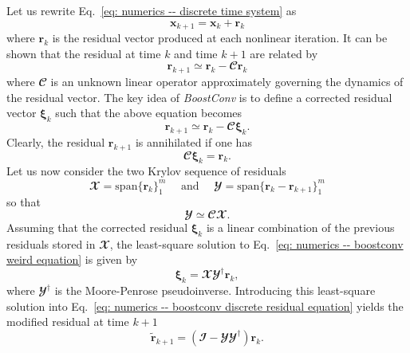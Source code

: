     Let us rewrite Eq.\ \eqref{eq: numerics -- discrete time system} as
    \begin{equation}
      \mathbf{x}_{k+1} = \mathbf{x}_k + \mathbf{r}_k
      \label{eq: numerics -- boostconv discrete system}
    \end{equation}
    where $\mathbf{r}_k$ is the residual vector produced at each nonlinear iteration. It can be shown that the residual at time $k$ and time $k+1$ are related by
    \begin{equation}
      \mathbf{r}_{k+1} \simeq \mathbf{r}_k - \mathbfcal{C} \mathbf{r}_k
      \label{eq: numerics: boostconv -- residual equation}
    \end{equation}
    where $\mathbfcal{C}$ is an unknown linear operator approximately governing the dynamics of the residual vector. The key idea of \emph{BoostConv} is to define a corrected residual vector $\boldsymbol{\xi}_{k}$ such that the above equation becomes
    \begin{equation}
      \mathbf{r}_{k+1} \simeq \mathbf{r}_k - \mathbfcal{C} \boldsymbol{\xi}_k.
      \label{eq: numerics -- boostconv discrete residual equation}
    \end{equation}
    Clearly, the residual $\mathbf{r}_{k+1}$ is annihilated if one has
    \begin{equation}
      \mathbfcal{C} \boldsymbol{\xi}_k = \mathbf{r}_k.
      \label{eq: numerics -- boostconv weird equation}
    \end{equation}
    Let us now consider the two Krylov sequence of residuals
    \begin{equation*}
      \mathbfcal{X} = \text{span}\{ \mathbf{r}_k\}_1^m \quad \text{ and } \quad \mathbfcal{Y} = \text{span}\{ \mathbf{r}_k-\mathbf{r}_{k+1}\}_1^m
    \end{equation*}
    so that
    $$\mathbfcal{Y} \simeq \mathbfcal{C} \mathbfcal{X}.$$
    Assuming that the corrected residual $\boldsymbol{\xi}_k$ is a linear combination of the previous residuals stored in $\mathbfcal{X}$, the least-square solution to Eq.\ \eqref{eq: numerics -- boostconv weird equation} is given by
    \begin{equation}
      \boldsymbol{\xi}_k = \mathbfcal{X} \mathbfcal{Y}^{\dagger} \mathbf{r}_k,
    \end{equation}
    where $\mathbfcal{Y}^{\dagger}$ is the Moore-Penrose pseudoinverse. Introducing this least-square solution into Eq.\ \eqref{eq: numerics -- boostconv discrete residual equation} yields the modified residual at time $k+1$
    \begin{equation}
      \tilde{\mathbf{r}}_{k+1} = (\mathbfcal{I}-\mathbfcal{Y}\mathbfcal{Y}^{\dagger})\mathbf{r}_k.
      \label{eq: numerics -- residual k+1 w/o correction}
    \end{equation}
